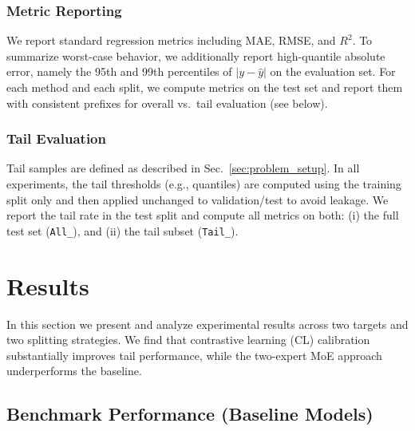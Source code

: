 \documentclass[11pt,conference,onecolumn]{IEEEtran}
\begin{document}
\subsubsection{Metric Reporting}
\label{sec:metric_reporting}
We report standard regression metrics including MAE, RMSE, and \(R^2\).
To summarize worst-case behavior, we additionally report high-quantile absolute error, namely the 95th and 99th percentiles of \(|y-\hat{y}|\) on the evaluation set.
For each method and each split, we compute metrics on the test set and report them with consistent prefixes for overall vs.\ tail evaluation (see below).

\subsubsection{Tail Evaluation}
\label{sec:tail_evaluation_protocol}
Tail samples are defined as described in Sec.~\ref{sec:problem_setup}. In all experiments, the tail thresholds (e.g., quantiles) are computed using the training split only and then applied unchanged to validation/test to avoid leakage.
We report the tail rate in the test split and compute all metrics on both:
(i) the full test set (\texttt{All\_}), and
(ii) the tail subset (\texttt{Tail\_}).



\section{Results}

In this section we present and analyze experimental results across two targets and two splitting strategies. We find that contrastive learning (CL) calibration substantially improves tail performance, while the two-expert MoE approach underperforms the baseline.

\subsection{Benchmark Performance (Baseline Models)}
\end{document}
